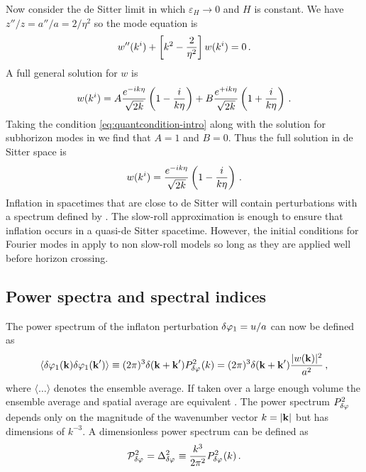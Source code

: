 Now consider the de Sitter limit in which $\varepsilon_H\rightarrow 0$ and $H$
is constant. We have $z''/z = a''/a = 2/\eta^2$ so the mode equation is
% 
\begin{equation}
  w''(k^i) + \left[ k^2 -\frac{2}{\eta^2} \right]w(k^i) = 0\,.
\end{equation}
% 
A full general solution for $w$ is
% 
\begin{equation}
 w(k^i) = A\frac{e^{-ik\eta}}{\sqrt{2k}}\left(1 -\frac{i}{k\eta}\right)
	  +B\frac{e^{+ik\eta}}{\sqrt{2k}}\left(1 +\frac{i}{k\eta}\right)\,.
\end{equation}
% 
Taking the condition \eqref{eq:quantcondition-intro} along with the solution
for subhorizon modes in  we find that $A=1$ and $B=0$.
Thus the full solution in de Sitter space is \cite{book:liddle}
% 
\begin{equation}
\label{eq:wfinal-intro}
 w(k^i) = \frac{e^{-ik\eta}}{\sqrt{2k}}\left(1 -\frac{i}{k\eta}\right)\,.
\end{equation}
% 
Inflation in spacetimes that are close to de Sitter will contain perturbations
with a spectrum defined by . The slow-roll approximation is
enough to ensure that inflation occurs in a quasi-de Sitter spacetime.
However, the initial conditions for Fourier modes in 
apply to non slow-roll models so long as they are applied well before horizon
crossing.


\subsection{Power spectra and spectral indices}
The power spectrum of the inflaton perturbation $\delta\varphi_{1} = u/a$ can now be
defined as
% 
\begin{equation}
  \langle \delta\varphi_{1}(\textbf{k}) \delta\varphi_{1}(\textbf{k}') \rangle 
   \equiv (2\pi)^3 \delta(\textbf{k} + \textbf{k}') P_{\delta\varphi_{}}^2 (k)
   = (2\pi)^3 \delta(\textbf{k} + \textbf{k}') \frac{|w(\textbf{k})|^2}{a^2}\,,
\end{equation}
% 
where $\langle \ldots \rangle$ denotes the ensemble average. 
If taken over a large enough volume the ensemble average and spatial average
are equivalent \cite{book:lyth}.
The power spectrum
$P_{\delta\varphi_{}}^2$ depends only on the magnitude of the wavenumber
vector $k=|\bf{k}|$ but has dimensions of $k^{-3}$. A dimensionless power
spectrum
can be defined as
% 
\begin{equation}
 \label{eq:curlPrdefn-intro}
 \mathcal{P}_{\delta\varphi_{}}^2= \Delta^2_{\delta\varphi_{}} \equiv \frac{k^3}{2\pi^2}
P_{\delta\varphi_{}}^2(k)\,.
\end{equation}
% 

